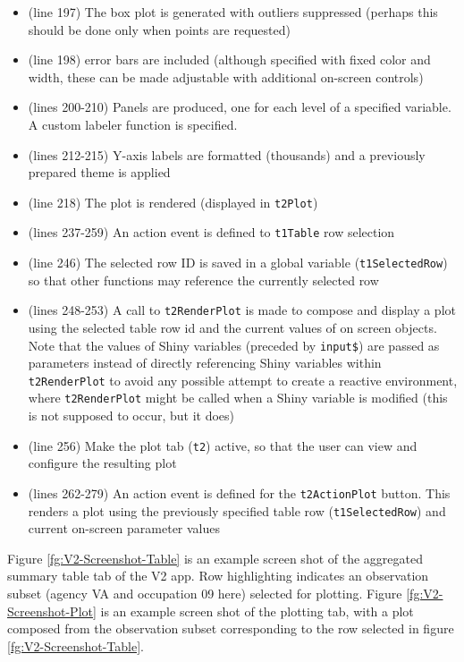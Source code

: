 \documentclass[10pt, letterpaper]{article}
\begin{document}
\begin{spacing}{1.0}
\begin{itemize}
\begin{itemize}
\begin{itemize}
              \item (line 197) The box plot is generated with outliers suppressed (perhaps this should be done only when points are requested)
              \item (line 198) error bars are included (although specified with fixed color and width, these can be made adjustable with additional on-screen controls)
              \item (lines 200-210) Panels are produced, one for each level of a specified variable.  A custom labeler function is specified.
              \item (lines 212-215) Y-axis labels are formatted (thousands) and a previously prepared theme is applied
              \item (line 218) The plot is rendered (displayed in \texttt{t2Plot})
              \item (lines 237-259) An action event is defined to \texttt{t1Table} row selection
              \item (line 246) The selected row ID is saved in a global variable (\texttt{t1SelectedRow}) so that other functions may reference the currently selected row
              \item (lines 248-253) A call to \texttt{t2RenderPlot} is made to compose and display a plot using the selected table row id and the current values of on screen objects.  Note that the values of Shiny variables (preceded by \texttt{input\$}) are passed as parameters instead of directly referencing Shiny variables within \texttt{t2RenderPlot} to avoid any possible attempt to create a reactive environment,  where \texttt{t2RenderPlot} might be called when a Shiny variable is modified (this is not supposed to occur, but it does)
              \item (line 256) Make the plot tab (\texttt{t2}) active, so that the user can view and configure the resulting plot
              \item (lines 262-279) An action event is defined for the \texttt{t2ActionPlot} button.  This renders a plot using the previously specified table row (\texttt{t1SelectedRow}) and current on-screen parameter values
          \end{itemize}
      \end{itemize}

\end{itemize}

Figure \ref{fg:V2-Screenshot-Table} is an example screen shot of the aggregated summary table tab of the V2 app.  Row highlighting indicates an observation subset (agency VA and occupation 09 here) selected for plotting.  Figure \ref{fg:V2-Screenshot-Plot} is an example screen shot of the plotting tab, with a plot composed from the observation subset corresponding to the row selected in figure \ref{fg:V2-Screenshot-Table}.\\


\end{spacing}
\end{document}
